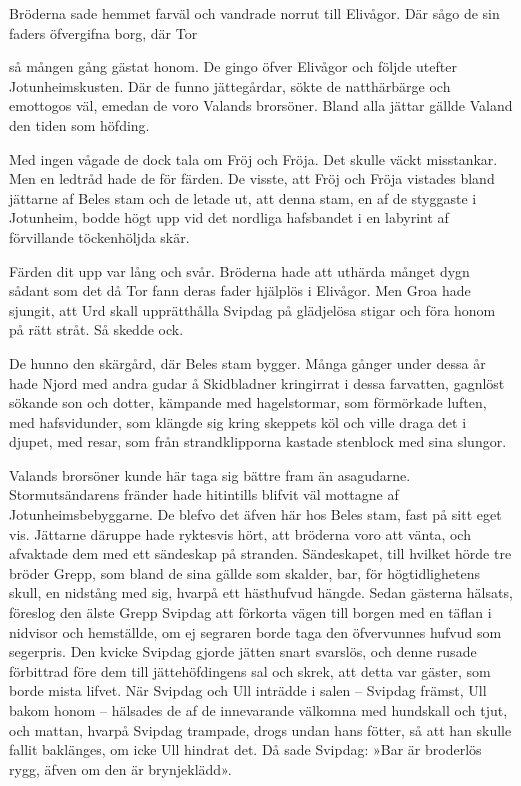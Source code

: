 Bröderna sade hemmet farväl och vandrade norrut till Elivågor. Där sågo
de sin faders öfvergifna borg, där Tor

så mången gång gästat honom. De gingo öfver Elivågor och följde utefter
Jotunheimskusten. Där de funno jättegårdar, sökte de natthärbärge och
emottogos väl, emedan de voro Valands brorsöner. Bland alla jättar
gällde Valand den tiden som höfding.

Med ingen vågade de dock tala om Fröj och Fröja. Det skulle väckt
misstankar. Men en ledtråd hade de för färden. De visste, att Fröj och
Fröja vistades bland jättarne af Beles stam och de letade ut, att denna
stam, en af de styggaste i Jotunheim, bodde högt upp vid det nordliga
hafsbandet i en labyrint af förvillande töckenhöljda skär.

Färden dit upp var lång och svår. Bröderna hade att uthärda månget dygn
sådant som det då Tor fann deras fader hjälplös i Elivågor. Men Groa
hade sjungit, att Urd skall upprätthålla Svipdag på glädjelösa stigar
och föra honom på rätt stråt. Så skedde ock.

De hunno den skärgård, där Beles stam bygger. Många gånger under dessa
år hade Njord med andra gudar å Skidbladner kringirrat i dessa
farvatten, gagnlöst sökande son och dotter, kämpande med hagelstormar,
som förmörkade luften, med hafsvidunder, som klängde sig kring skeppets
köl och ville draga det i djupet, med resar, som från strandklipporna
kastade stenblock med sina slungor.

Valands brorsöner kunde här taga sig bättre fram än asagudarne.
Stormutsändarens fränder hade hitintills blifvit väl mottagne af
Jotunheimsbebyggarne. De blefvo det äfven här hos Beles stam, fast på
sitt eget vis. Jättarne däruppe hade ryktesvis hört, att bröderna voro
att vänta, och afvaktade dem med ett sändeskap på stranden. Sändeskapet,
till hvilket hörde tre bröder Grepp, som bland de sina gällde som
skalder, bar, för högtidlighetens skull, en nidstång med sig, hvarpå ett
hästhufvud hängde. Sedan gästerna hälsats, föreslog den älste Grepp
Svipdag att förkorta vägen till borgen med en täflan i nidvisor och
hemställde, om ej segraren borde taga den öfvervunnes hufvud som
segerpris. Den kvicke Svipdag gjorde jätten snart svarslös, och denne
rusade
förbittrad
före dem till jättehöfdingens sal och skrek, att detta var gäster, som
borde mista lifvet. När Svipdag och Ull inträdde i salen -- Svipdag
främst, Ull bakom honom -- hälsades de af de innevarande välkomna med
hundskall och tjut, och mattan, hvarpå Svipdag trampade, drogs undan
hans fötter, så att han skulle fallit baklänges, om icke Ull hindrat
det. Då sade Svipdag: »Bar är broderlös rygg, äfven om den är
brynjeklädd».

